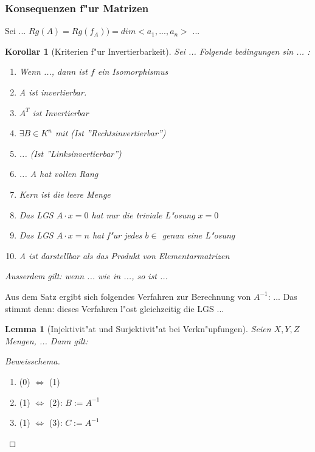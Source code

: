 \documentclass[11pt]{article}
\newtheorem*{lemma}{Lemma}
\newtheorem*{korollar}{Korollar}
\begin{document}
\subsubsection{Konsequenzen f"ur Matrizen}
\label{sec:konsma}

Sei ...
$Rg(A)=Rg(f_A))=dim<a_1,...,a_n>$ ...

\begin{korollar}[Kriterien f"ur Invertierbarkeit]
  Sei ... Folgende bedingungen sin ... :
  \begin{enumerate}
  \item Wenn ..., dann ist $f$ ein Isomorphismus
  \item A ist invertierbar.
  \item $A^T$ ist Invertierbar
  \item $\exists B\in K^n$ mit (Ist ''Rechtsinvertierbar'')
  \item ... (Ist ''Linksinvertierbar'')
  \item ... A hat vollen Rang
  \item Kern ist die leere Menge
  \item Das LGS $A\cdot x = 0$ hat nur die triviale L"osung $x=0$
  \item Das LGS $A\cdot x = n$ hat f"ur jedes $b\in $ genau eine L"osung
  \item A ist darstellbar als das Produkt von Elementarmatrizen
  \end{enumerate}

  Ausserdem gilt: wenn ... wie in ..., so ist ... 
\end{korollar}

Aus dem Satz ergibt sich folgendes Verfahren zur Berechnung von $A^{-1}$: ...
Das stimmt denn: dieses Verfahren l"ost gleichzeitig die LGS ...

\begin{lemma}[Injektivit"at und Surjektivit"at bei Verkn"upfungen]
  Seien $X,Y,Z$ Mengen, ... Dann gilt:  
\end{lemma}

\begin{proof}[Beweisschema]
  \begin{enumerate}
  \item (0) $ \iff $ (1)
  \item (1) $ \iff $ (2): $B:=A^{-1}$
  \item (1) $ \iff $ (3): $C:=A^{-1}$
  \end{enumerate}
\end{proof}
\end{document}
